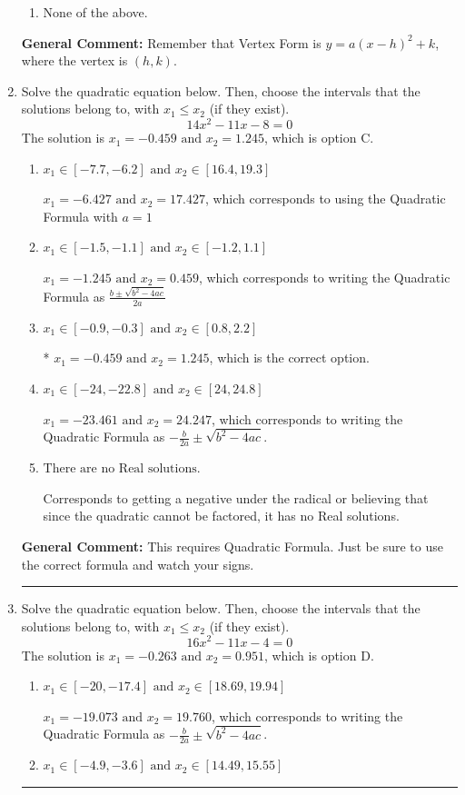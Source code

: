 \documentclass{extbook}[14pt]
\newcommand{\litem}[1]{\item #1

\rule{\textwidth}{0.4pt}}
\begin{document}
\begin{enumerate}
{\begin{enumerate}[label=\Alph*.]
\begin{multicols}{2}
\end{multicols}\item None of the above.\end{enumerate}
\textbf{General Comment:} Remember that Vertex Form is $y = a(x-h)^2+k$, where the vertex is $(h, k)$.
}
\litem{
Solve the quadratic equation below. Then, choose the intervals that the solutions belong to, with $x_1 \leq x_2$ (if they exist).
\[ 14x^{2} -11 x -8 = 0 \]The solution is \( x_1 = -0.459 \text{ and } x_2 = 1.245 \), which is option C.\begin{enumerate}[label=\Alph*.]
\item \( x_1 \in [-7.7, -6.2] \text{ and } x_2 \in [16.4, 19.3] \)

 $x_1 = -6.427 \text{ and } x_2 = 17.427$, which corresponds to using the Quadratic Formula with $a=1$
\item \( x_1 \in [-1.5, -1.1] \text{ and } x_2 \in [-1.2, 1.1] \)

 $x_1 = -1.245 \text{ and } x_2 = 0.459$, which corresponds to writing the Quadratic Formula as $\frac{b \pm \sqrt{b^2 - 4ac}}{2a}$
\item \( x_1 \in [-0.9, -0.3] \text{ and } x_2 \in [0.8, 2.2] \)

* $x_1 = -0.459 \text{ and } x_2 = 1.245$, which is the correct option.
\item \( x_1 \in [-24, -22.8] \text{ and } x_2 \in [24, 24.8] \)

 $x_1 = -23.461 \text{ and } x_2 = 24.247$, which corresponds to writing the Quadratic Formula as $-\frac{b}{2a} \pm \sqrt{b^2 - 4ac}$.
\item \( \text{There are no Real solutions.} \)

Corresponds to getting a negative under the radical or believing that since the quadratic cannot be factored, it has no Real solutions.
\end{enumerate}

\textbf{General Comment:} This requires Quadratic Formula. Just be sure to use the correct formula and watch your signs.
}
\litem{
Solve the quadratic equation below. Then, choose the intervals that the solutions belong to, with $x_1 \leq x_2$ (if they exist).
\[ 16x^{2} -11 x -4 = 0 \]The solution is \( x_1 = -0.263 \text{ and } x_2 = 0.951 \), which is option D.\begin{enumerate}[label=\Alph*.]
\item \( x_1 \in [-20, -17.4] \text{ and } x_2 \in [18.69, 19.94] \)

 $x_1 = -19.073 \text{ and } x_2 = 19.760$, which corresponds to writing the Quadratic Formula as $-\frac{b}{2a} \pm \sqrt{b^2 - 4ac}$.
\item \( x_1 \in [-4.9, -3.6] \text{ and } x_2 \in [14.49, 15.55] \)


\end{enumerate}}
\end{enumerate}
\end{document}

